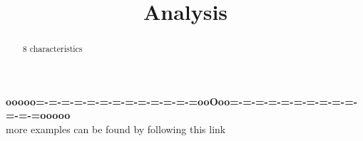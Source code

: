 \documentclass{ximera}
\title{Analysis}
\begin{document}
\begin{abstract}
8 characteristics
\end{abstract}
\maketitle













\begin{center}
\textbf{\textcolor{green!50!black}{ooooo=-=-=-=-=-=-=-=-=-=-=-=-=ooOoo=-=-=-=-=-=-=-=-=-=-=-=-=ooooo}} \\

more examples can be found by following this link\\ 

\end{center}
\end{document}
